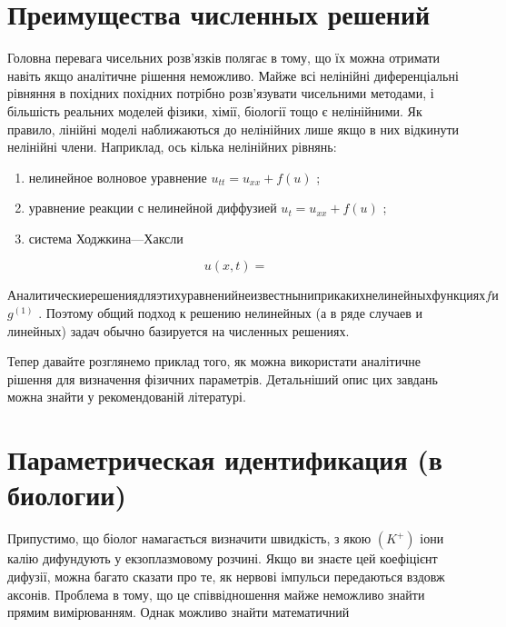 \documentclass[
  ukrainian,
]{article}
\begin{document}
\section{Преимущества численных
решений}\label{ux43fux440ux435ux438ux43cux443ux449ux435ux441ux442ux432ux430-ux447ux438ux441ux43bux435ux43dux43dux44bux445-ux440ux435ux448ux435ux43dux438ux439}

Головна перевага чисельних розв'язків полягає в тому, що їх можна
отримати навіть якщо аналітичне рішення неможливо. Майже всі нелінійні
диференціальні рівняння в похідних похідних потрібно розв'язувати
чисельними методами, і більшість реальних моделей фізики, хімії,
біології тощо є нелінійними. Як правило, лінійні моделі наближаються до
нелінійних лише якщо в них відкинути нелінійні члени. Наприклад, ось
кілька нелінійних рівнянь:

\begin{enumerate}
\def\labelenumi{\arabic{enumi})}
\item
  нелинейное волновое уравнение \(u_{tt} = u_{xx} + f(u)\) ;
\item
  уравнение реакции с нелинейной диффузией \(u_t = u_{xx} + f(u)\) ;
\item
  система Ходжкина---Хаксли
\end{enumerate}

\[
u(x, t) =
\]

\(Аналитические решения для этих уравнений не известны ни при каких нелинейных функциях f и\)
\(g^{(1)}\) . Поэтому общий подход к решению нелинейных (а в ряде
случаев и линейных) задач обычно базируется на численных решениях.

Тепер давайте розглянемо приклад того, як можна використати аналітичне
рішення для визначення фізичних параметрів. Детальніший опис цих завдань
можна знайти у рекомендованій літературі.

\section{Параметрическая идентификация (в
биологии)}\label{ux43fux430ux440ux430ux43cux435ux442ux440ux438ux447ux435ux441ux43aux430ux44f-ux438ux434ux435ux43dux442ux438ux444ux438ux43aux430ux446ux438ux44f-ux432-ux431ux438ux43eux43bux43eux433ux438ux438}

Припустимо, що біолог намагається визначити швидкість, з якою \((K^+)\)
іони калію дифундують у екзоплазмовому розчині. Якщо ви знаєте цей
коефіцієнт дифузії, можна багато сказати про те, як нервові імпульси
передаються вздовж аксонів. Проблема в тому, що це співвідношення майже
неможливо знайти прямим вимірюванням. Однак можливо знайти математичний
\end{document}
